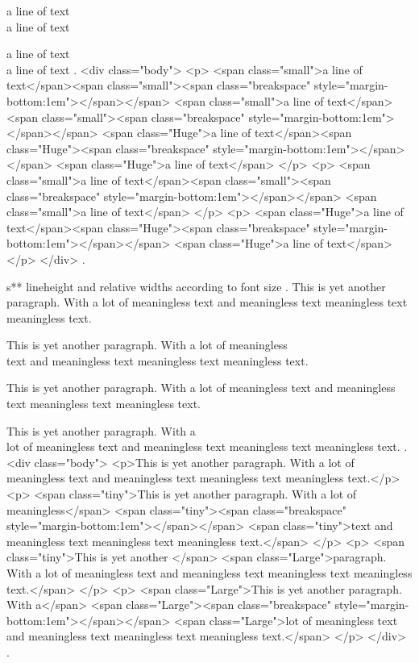 \small
a line of text\\[1em]
a line of text

\Huge
a line of text\\[1em]
a line of text
.
<div class="body">
<p>
<span class="small">a line of text</span><span class="small"><span class="breakspace" style="margin-bottom:1em"></span></span>
<span class="small">a line of text</span><span class="small"><span class="breakspace" style="margin-bottom:1em"></span></span>
<span class="Huge">a line of text</span><span class="Huge"><span class="breakspace" style="margin-bottom:1em"></span></span>
<span class="Huge">a line of text</span>
</p>
<p>
<span class="small">a line of text</span><span class="small"><span class="breakspace" style="margin-bottom:1em"></span></span>
<span class="small">a line of text</span>
</p>
<p>
<span class="Huge">a line of text</span><span class="Huge"><span class="breakspace" style="margin-bottom:1em"></span></span>
<span class="Huge">a line of text</span>
</p>
</div>
.


s** lineheight and relative widths according to font size
.
This is yet another paragraph. With a lot of meaningless text and meaningless text meaningless text meaningless text.

\tiny This is yet another paragraph.  With a lot of meaningless\\[1em] text and meaningless text meaningless text meaningless text.

This is yet another \Large paragraph. With a lot of meaningless text and meaningless text meaningless text meaningless text.

This is yet another paragraph. With a\\[1em] lot of meaningless text and meaningless text meaningless text meaningless text.
.
<div class="body">
<p>This is yet another paragraph. With a lot of meaningless text and meaningless text meaningless text meaningless text.</p>
<p>
<span class="tiny">This is yet another paragraph. With a lot of meaningless</span>
<span class="tiny"><span class="breakspace" style="margin-bottom:1em"></span></span>
<span class="tiny">text and meaningless text meaningless text meaningless text.</span>
</p>
<p>
<span class="tiny">This is yet another </span>
<span class="Large">paragraph. With a lot of meaningless text and meaningless text meaningless text meaningless text.</span>
</p>
<p>
<span class="Large">This is yet another paragraph. With a</span>
<span class="Large"><span class="breakspace" style="margin-bottom:1em"></span></span>
<span class="Large">lot of meaningless text and meaningless text meaningless text meaningless text.</span>
</p>
</div>
.
